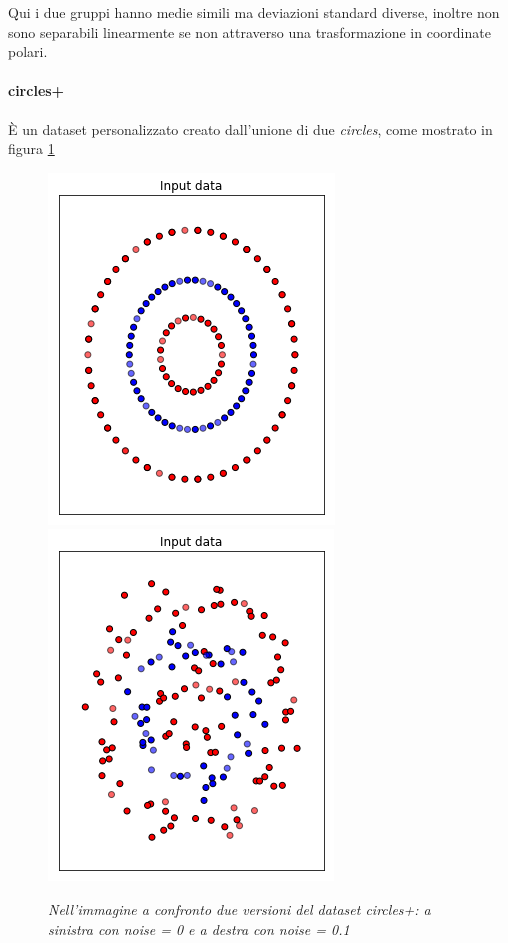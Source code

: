 \documentclass[12pt,a4paper]{report}
\begin{document}
Qui i due gruppi hanno medie simili ma deviazioni standard diverse, inoltre non sono separabili linearmente se non attraverso una trasformazione in coordinate polari.

\paragraph{circles+} È un dataset personalizzato creato dall'unione di due \textit{circles}, come mostrato in figura \ref{circles+}

\begin{figure}[H]
 \centering
 \includegraphics[scale = 0.5]{images/circles+_nonoise}
 \includegraphics[scale = 0.5]{images/circles+_noise}
 \caption{\textit {Nell'immagine a confronto due versioni del dataset circles+: a sinistra con noise = 0 e a destra con noise = 0.1 }}
 \label{circles+}
\end{figure}
\end{document}
